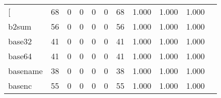 \begin{longtable}{lp{1.2cm}p{1.2cm}p{1.2cm}p{1.2cm}p{1.2cm}p{1.2cm}p{1.2cm}p{1.2cm}p{1.2cm}p{1.2cm}}
\bottomrule
\endlastfoot
{[}         &                                    68 &                                                  0 &                                                  0 &                                                  0 &                                                  0 &                                                 68 &                                         1.000 &                                              1.000 &                                              1.000 \\
b2sum     &                                    56 &                                                  0 &                                                  0 &                                                  0 &                                                  0 &                                                 56 &                                         1.000 &                                              1.000 &                                              1.000 \\
base32    &                                    41 &                                                  0 &                                                  0 &                                                  0 &                                                  0 &                                                 41 &                                         1.000 &                                              1.000 &                                              1.000 \\
base64    &                                    41 &                                                  0 &                                                  0 &                                                  0 &                                                  0 &                                                 41 &                                         1.000 &                                              1.000 &                                              1.000 \\
basename  &                                    38 &                                                  0 &                                                  0 &                                                  0 &                                                  0 &                                                 38 &                                         1.000 &                                              1.000 &                                              1.000 \\
basenc    &                                    55 &                                                  0 &                                                  0 &                                                  0 &                                                  0 &                                                 55 &                                         1.000 &                                              1.000 &                                              1.000 \\

\end{longtable}

